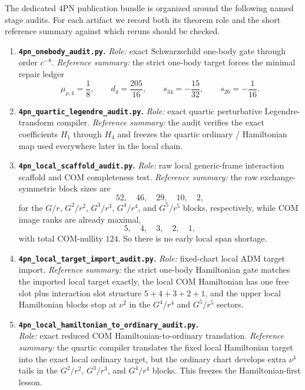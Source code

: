 \documentclass[11pt]{article}
\begin{document}
The dedicated $4$PN publication bundle is organized around the following named
stage audits.  For each artifact we record both its theorem role and the short
reference summary against which reruns should be checked.

\begin{enumerate}
  \item \textbf{\nolinkurl{4pn_onebody_audit.py}.}  \emph{Role:} exact
  Schwarzschild one-body gate through order $c^{-8}$.  \emph{Reference
  summary:} the strict one-body target forces the minimal repair ledger
  \[
  \mu_{\rho,4}=\frac18,
  \qquad
  d_4=\frac{205}{16},
  \qquad
  s_{34}=-\frac{15}{32},
  \qquad
  s_{26}=-\frac1{16}.
  \]

  \item \textbf{\nolinkurl{4pn_quartic_legendre_audit.py}.}  \emph{Role:}
  exact quartic perturbative Legendre-transform compiler.  \emph{Reference
  summary:} the audit verifies the exact coefficients $H_1$ through $H_4$ and
  freezes the quartic ordinary / Hamiltonian map used everywhere later in the
  local chain.

  \item \textbf{\nolinkurl{4pn_local_scaffold_audit.py}.}  \emph{Role:}
  raw local generic-frame interaction scaffold and COM completeness test.
  \emph{Reference summary:} the raw exchange-symmetric block sizes are
  \[
  52,\quad 46,\quad 29,\quad 10,\quad 2,
  \]
  for the $G/r$, $G^2/r^2$, $G^3/r^3$, $G^4/r^4$, and $G^5/r^5$ blocks,
  respectively, while COM image ranks are already maximal,
  \[
  5,\quad 4,\quad 3,\quad 2,\quad 1,
  \]
  with total COM-nullity $124$.  So there is no early local span shortage.

  \item \textbf{\nolinkurl{4pn_local_target_import_audit.py}.}
  \emph{Role:} fixed-chart local ADM target import.  \emph{Reference
  summary:} the strict one-body Hamiltonian gate matches the imported local
  target exactly, the local COM Hamiltonian has one free slot plus interaction
  slot structure $5+4+3+2+1$, and the upper local Hamiltonian blocks stop at
  $\nu^2$ in the $G^4/r^4$ and $G^5/r^5$ sectors.

  \item \textbf{\nolinkurl{4pn_local_hamiltonian_to_ordinary_audit.py}.}\\
  \emph{Role:} exact reduced COM Hamiltonian-to-ordinary translation.
  \emph{Reference summary:} the quartic compiler translates the fixed local
  Hamiltonian target into the exact local ordinary target, but the ordinary
  chart develops extra $\nu^4$ tails in the $G^2/r^2$, $G^3/r^3$, and
  $G^4/r^4$ blocks.  This freezes the Hamiltonian-first lesson.


\end{enumerate}
\end{document}
